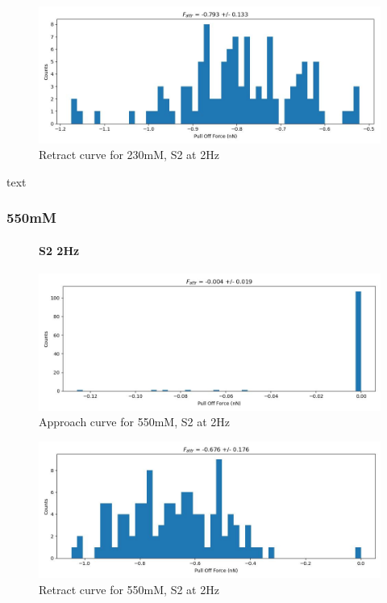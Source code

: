 \begin{figure}[h!]
\centering
\includegraphics[width=\textwidth]{chapter7/Tip speed/230mM/S2 2Hz/retract_f_a_hist.jpg}
\caption{Retract curve for 230mM, S2 at 2Hz}
\end{figure}
text
\newpage

\subsubsection*{550mM}

\begin{figure}[h!]
\paragraph{S2 2Hz}
\centering
\includegraphics[width=\textwidth]{chapter7/Tip speed/550mM/S2 2Hz/approach_f_a_hist.jpg}
\caption{Approach curve for 550mM, S2 at 2Hz}
\end{figure}

\begin{figure}[h!]
\centering
\includegraphics[width=\textwidth]{chapter7/Tip speed/550mM/S2 2Hz/retract_f_a_hist.jpg}
\caption{Retract curve for 550mM, S2 at 2Hz}
\end{figure}


